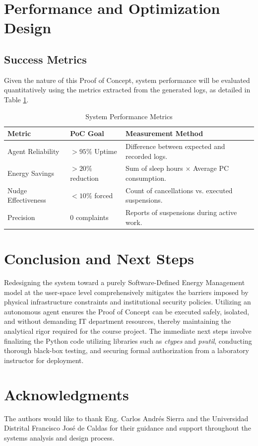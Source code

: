 \documentclass[conference]{IEEEtran}
\begin{document}
\section{Performance and Optimization Design}

\subsection{Success Metrics}
Given the nature of this Proof of Concept, system performance will be evaluated quantitatively using the metrics extracted from the generated logs, as detailed in Table \ref{tab:metrics}.

\begin{table}[htbp]
\caption{System Performance Metrics}
\label{tab:metrics}
\centering
\begin{tabular}{|p{2.5cm}|p{2cm}|p{3cm}|}
\hline
\textbf{Metric} & \textbf{PoC Goal} & \textbf{Measurement Method} \\
\hline
Agent Reliability & $>95\%$ Uptime & Difference between expected and recorded logs. \\
\hline
Energy Savings & $>20\%$ reduction & Sum of sleep hours $\times$ Average PC consumption. \\
\hline
Nudge Effectiveness & $<10\%$ forced & Count of cancellations vs. executed suspensions. \\
\hline
Precision & $0$ complaints & Reports of suspensions during active work. \\
\hline
\end{tabular}
\end{table}

\section{Conclusion and Next Steps}
Redesigning the system toward a purely Software-Defined Energy Management model at the user-space level comprehensively mitigates the barriers imposed by physical infrastructure constraints and institutional security policies. Utilizing an autonomous agent ensures the Proof of Concept can be executed safely, isolated, and without demanding IT department resources, thereby maintaining the analytical rigor required for the course project. The immediate next steps involve finalizing the Python code utilizing libraries such as \textit{ctypes} and \textit{psutil}, conducting thorough black-box testing, and securing formal authorization from a laboratory instructor for deployment.

\section*{Acknowledgments}
The authors would like to thank Eng. Carlos Andrés Sierra and the Universidad Distrital Francisco José de Caldas for their guidance and support throughout the systems analysis and design process.
\end{document}
